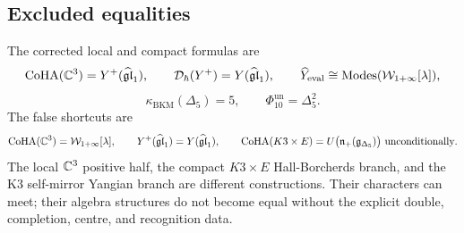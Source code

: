 \subsection*{Excluded equalities}

The corrected local and compact formulas are
\[
  \mathrm{CoHA}(\mathbb{C}^3)=Y^{+}(\widehat{\mathfrak{gl}}_1),
  \qquad
  \mathcal D_\hbar(Y^{+})=Y(\widehat{\mathfrak{gl}}_1),
  \qquad
  \widehat{Y}_{\mathrm{eval}}
  \cong
  \operatorname{Modes}(\mathcal{W}_{1+\infty}[\lambda]),
\]
\[
  \kappa_{\mathrm{BKM}}(\Delta_5)=5,
  \qquad
  \Phi_{10}^{\mathrm{un}}=\Delta_5^2.
\]
The false shortcuts are
\[
  \mathrm{CoHA}(\mathbb{C}^3)=\mathcal{W}_{1+\infty}[\lambda],
  \qquad
  Y^{+}(\widehat{\mathfrak{gl}}_1)=Y(\widehat{\mathfrak{gl}}_1),
  \qquad
  \mathrm{CoHA}(K3\times E)
  =
  U\bigl(\mathfrak n_+(\mathfrak g_{\Delta_5})\bigr)
  \text{ unconditionally}.
\]
The local \(\mathbb{C}^3\) positive half, the compact \(K3\times E\)
Hall-Borcherds branch, and the K3 self-mirror Yangian branch are
different constructions.  Their characters can meet; their algebra
structures do not become equal without the explicit double,
completion, centre, and recognition data.
